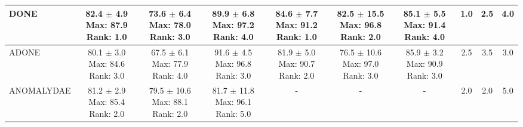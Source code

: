 \begin{longtable}{|l|c|c|c|c|c|c|c|c|c|}
DONE & \makecell{ 82.4 $\pm$ 4.9 \\ \scriptsize Max: 87.9 \\ \scriptsize Rank: 1.0 } & \makecell{ 73.6 $\pm$ 6.4 \\ \scriptsize Max: 78.0 \\ \scriptsize Rank: 3.0 } & \makecell{ 89.9 $\pm$ 6.8 \\ \scriptsize Max: 97.2 \\ \scriptsize Rank: 4.0 } & \makecell{ 84.6 $\pm$ 7.7 \\ \scriptsize Max: 91.2 \\ \scriptsize Rank: 1.0 } & \makecell{ 82.5 $\pm$ 15.5 \\ \scriptsize Max: 96.8 \\ \scriptsize Rank: 2.0 } & \makecell{ 85.1 $\pm$ 5.5 \\ \scriptsize Max: 91.4 \\ \scriptsize Rank: 4.0 } & 1.0 & 2.5 & 4.0 \\ \hline 
ADONE & \makecell{ 80.1 $\pm$ 3.0 \\ \scriptsize Max: 84.6 \\ \scriptsize Rank: 3.0 } & \makecell{ 67.5 $\pm$ 6.1 \\ \scriptsize Max: 77.9 \\ \scriptsize Rank: 4.0 } & \makecell{ 91.6 $\pm$ 4.5 \\ \scriptsize Max: 96.8 \\ \scriptsize Rank: 3.0 } & \makecell{ 81.9 $\pm$ 5.0 \\ \scriptsize Max: 90.7 \\ \scriptsize Rank: 2.0 } & \makecell{ 76.5 $\pm$ 10.6 \\ \scriptsize Max: 97.0 \\ \scriptsize Rank: 3.0 } & \makecell{ 85.9 $\pm$ 3.2 \\ \scriptsize Max: 90.9 \\ \scriptsize Rank: 3.0 } & 2.5 & 3.5 & 3.0 \\ \hline 
ANOMALYDAE & \makecell{ 81.2 $\pm$ 2.9 \\ \scriptsize Max: 85.4 \\ \scriptsize Rank: 2.0 } & \makecell{ 79.5 $\pm$ 10.6 \\ \scriptsize Max: 88.1 \\ \scriptsize Rank: 2.0 } & \makecell{ 81.7 $\pm$ 11.8 \\ \scriptsize Max: 96.1 \\ \scriptsize Rank: 5.0 } & - & - & - & 2.0 & 2.0 & 5.0 \\ \hline 

\end{longtable}
